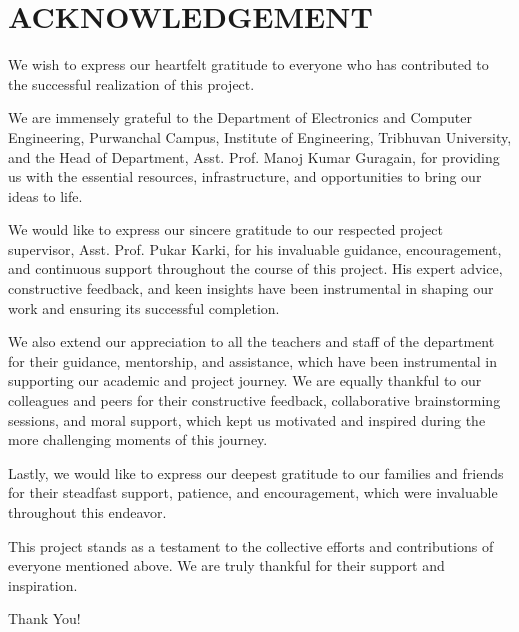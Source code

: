 \chapter*{\textbf{ACKNOWLEDGEMENT}}

We wish to express our heartfelt gratitude to everyone who has contributed to the successful realization of this project.

We are immensely grateful to the Department of Electronics and Computer Engineering, Purwanchal Campus, Institute of Engineering, Tribhuvan University, and the Head of Department, Asst. Prof. Manoj Kumar Guragain, for providing us with the essential resources, infrastructure, and opportunities to bring our ideas to life.

We would like to express our sincere gratitude to our respected project supervisor, Asst. Prof. Pukar Karki, for his invaluable guidance, encouragement, and continuous support throughout the course of this project. His expert advice, constructive feedback, and keen insights have been instrumental in shaping our work and ensuring its successful completion.

We also extend our appreciation to all the teachers and staff of the department for their guidance, mentorship, and assistance, which have been instrumental in supporting our academic and project journey. We are equally thankful to our colleagues and peers for their constructive feedback, collaborative brainstorming sessions, and moral support, which kept us motivated and inspired during the more challenging moments of this journey.

Lastly, we would like to express our deepest gratitude to our families and friends for their steadfast support, patience, and encouragement, which were invaluable throughout this endeavor.

This project stands as a testament to the collective efforts and contributions of everyone mentioned above. We are truly thankful for their support and inspiration.

\vspace{0.5cm}
\noindent Thank You!

